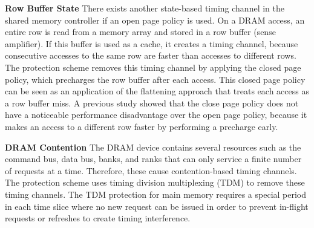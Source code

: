 \textbf{Row Buffer State}
There exists another state-based timing channel in the shared memory controller
if an open page policy is used. On a DRAM access, an entire row is read from
a memory array and stored in a row buffer (sense amplifier). If this buffer is
used as a cache, it creates a timing channel, because consecutive accesses to 
the same row are faster than accesses to different rows.
The protection scheme removes this timing channel by applying the closed page
policy, which precharges the row buffer after each access. This
closed page policy can be seen as an application of the flattening approach 
that treats each access as a row buffer miss. A previous study \cite{ushpca14}
showed that the close page policy does not have a noticeable performance
disadvantage over the open page policy, because it makes an access to a different
row faster by performing a precharge early.

\textbf{DRAM Contention}
The DRAM device contains several resources such as the command bus, data
bus, banks, and ranks that can only service a finite number of requests at a 
time. Therefore, these cause contention-based timing channels.
The protection scheme uses timing division multiplexing (TDM) to remove these
timing channels. The TDM protection for main memory requires a special period 
in each time slice where no new request can be issued in order to prevent
in-flight requests or refreshes to create timing interference.


